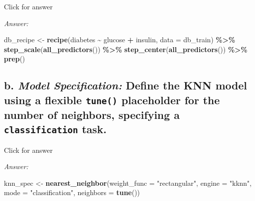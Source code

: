 \documentclass[
]{book}
\newenvironment{Shaded}{\begin{snugshade}}{\end{snugshade}}
\newcommand{\AttributeTok}[1]{\textcolor[rgb]{0.13,0.29,0.53}{#1}}
\newcommand{\FunctionTok}[1]{\textcolor[rgb]{0.13,0.29,0.53}{\textbf{#1}}}
\newcommand{\NormalTok}[1]{#1}
\newcommand{\OtherTok}[1]{\textcolor[rgb]{0.56,0.35,0.01}{#1}}
\newcommand{\SpecialCharTok}[1]{\textcolor[rgb]{0.81,0.36,0.00}{\textbf{#1}}}
\newcommand{\StringTok}[1]{\textcolor[rgb]{0.31,0.60,0.02}{#1}}
\begin{document}
Click for answer

\emph{Answer:}

\begin{Shaded}
\begin{Highlighting}[]
\NormalTok{db\_recipe }\OtherTok{\textless{}{-}} \FunctionTok{recipe}\NormalTok{(diabetes }\SpecialCharTok{\textasciitilde{}}\NormalTok{  glucose }\SpecialCharTok{+}\NormalTok{ insulin, }\AttributeTok{data =}\NormalTok{ db\_train) }\SpecialCharTok{\%\textgreater{}\%}
  \FunctionTok{step\_scale}\NormalTok{(}\FunctionTok{all\_predictors}\NormalTok{()) }\SpecialCharTok{\%\textgreater{}\%}
  \FunctionTok{step\_center}\NormalTok{(}\FunctionTok{all\_predictors}\NormalTok{()) }\SpecialCharTok{\%\textgreater{}\%} 
  \FunctionTok{prep}\NormalTok{()}
\end{Highlighting}
\end{Shaded}

\hypertarget{b.-model-specification-define-the-knn-model-using-a-flexible-tune-placeholder-for-the-number-of-neighbors-specifying-a-classification-task.}{%
\subsection{\texorpdfstring{b. \emph{Model Specification:} Define the KNN model using a flexible \texttt{tune()} placeholder for the number of neighbors, specifying a \texttt{classification} task.}{b. Model Specification: Define the KNN model using a flexible tune() placeholder for the number of neighbors, specifying a classification task.}}\label{b.-model-specification-define-the-knn-model-using-a-flexible-tune-placeholder-for-the-number-of-neighbors-specifying-a-classification-task.}}

Click for answer

\emph{Answer:}

\begin{Shaded}
\begin{Highlighting}[]
\NormalTok{knn\_spec }\OtherTok{\textless{}{-}} \FunctionTok{nearest\_neighbor}\NormalTok{(}\AttributeTok{weight\_func =} \StringTok{"rectangular"}\NormalTok{, }
                             \AttributeTok{engine =} \StringTok{"kknn"}\NormalTok{,}
                             \AttributeTok{mode =} \StringTok{"classification"}\NormalTok{,}
                             \AttributeTok{neighbors =} \FunctionTok{tune}\NormalTok{())}
\end{Highlighting}
\end{Shaded}
\end{document}
